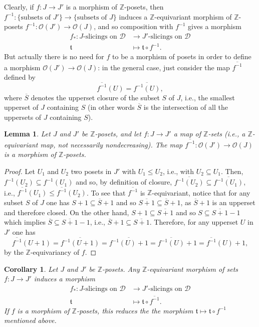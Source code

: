 \documentclass{article}
\newtheorem{cor}[thm]{Corollary}
\newtheorem{lem}[thm]{Lemma}
\theoremstyle{definition}
\newcommand{\Z}{\mathbb{Z}}
\newcommand{\Oo}{\mathcal{O}}
\newcommand{\tee}{\mathfrak{t}}
\begin{document}
Clearly, if $f\colon J\to J'$ is a morphism of $\Z$-posets, then $f^{-1}\colon \{\text{subsets of $J'$}\}\to \{\text{subsets of $J$}\}$ induces a $\Z$-equivariant morphism of $\Z$-posets $f^{-1}\colon \Oo(J')\to \Oo(J)$, and so composition with $f^{-1}$ gives a morphism
\begin{align*}
f_*\colon J\text{-slicings on $\mathscr{D}$}&\to J'\text{-slicings on $\mathscr{D}$}\\
\tee&\mapsto \tee\circ f^{-1}.
\end{align*}
But actually there is no need for $f$ to be a morphism of posets in order to define a morphism $\Oo(J')\to \Oo(J)$: in the general case, just consider the map $\overline{f^{-1}}$ defined by
\[
\overline{f^{-1}}(U)=\overline{f^{-1}(U)},
\]
where $\overline{S}$ denotes the upperset closure of the subset $S$ of $J$, i.e., the smallest upperset of $J$ containing $S$ (in other words  $\overline{S}$ is the intersection of all the uppersets of $J$ containing $S$).
\begin{lem}
Let $J$ and $J'$ be $\Z$-posets, and let $f\colon J\to J'$ a map of $\Z$-sets (i.e., a $\Z$-equivariant map, not necessarily nondecreasing). The map $\overline{f^{-1}}\colon \Oo(J')\to \Oo(J)$ is a morphism of $\Z$-posets.
\end{lem}
\begin{proof}
Let $U_1$ and $U_2$ two posets in $J'$ with $U_1\leq U_2$, i.e., with $U_2\subseteq U_1$. Then, $f^{-1}(U_2)\subseteq f^{-1}(U_1)$ and so, by definition of closure, $\overline{f^{-1}(U_2)}\subseteq \overline{f^{-1}(U_1)}$, i.e.,  $\overline{f^{-1}}(U_1)\leq \overline{f^{-1}}(U_2)$. To see that $\overline{f^{-1}}$ is $\Z$-equivariant, notice that for any subset $S$ of $J$ one has $S+1\subseteq \overline{S}+1$ and so $\overline{S+1}\subseteq \overline{S}+1$, as $\overline{S}+1$ is an upperset and therefore closed. On the other hand, $S+1\subseteq \overline{S+1}$ and so $S\subseteq \overline{S+1}-1$ which implies $\overline{S}\subseteq \overline{S+1}-1$, i.e., $\overline{S}+1\subseteq \overline{S+1}$. Therefore, for any upperset $U$ in $J'$ one has 
\[
\overline{f^{-1}}(U+1)=\overline{f^{-1}(U+1)}=\overline{f^{-1}(U)+1}=\overline{f^{-1}(U)}+1=\overline{f^{-1}}(U)+1,
\]
by the $\Z$-equivariancy of $f$.
\end{proof}
\begin{cor}
Let $J$ and $J'$ be $\Z$-posets. Any $\Z$-equivariant morphism of sets $f\colon J\to J'$ induces a morphism 
\begin{align*}
f_*\colon J\text{-slicings on $\mathscr{D}$}&\to J'\text{-slicings on $\mathscr{D}$}\\
\tee&\mapsto \tee\circ \overline{f^{-1}}.
\end{align*}
If $f$ is a morphism of $\Z$-posets, this reduces the the morphism $\tee\mapsto \tee\circ f^{-1}$ mentioned above.
\end{cor}
\end{document}
